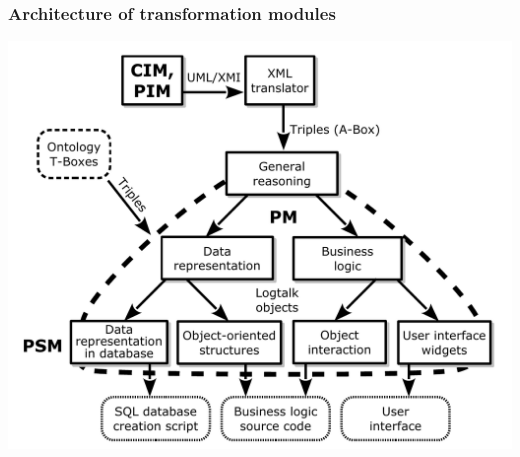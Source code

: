 \documentclass[10pt]{beamer}
\begin{document}
\begin{frame}
  \frametitle{Architecture of transformation modules}
  \centering
  \includegraphics[width=0.9\linewidth]{architect_tree_pres-en-wo-OCL.pdf}
\end{frame}
\end{document}
